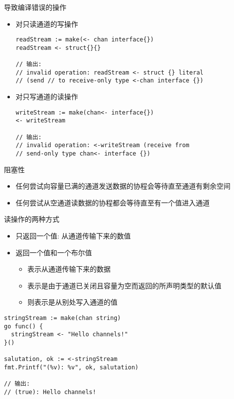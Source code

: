 \begin{frame}[fragile]{导致编译错误的操作}
\begin{itemize}
    \item 对只读通道的写操作
\begin{lstlisting}
readStream := make(<- chan interface{})
readStream <- struct{}{}

// 输出:
// invalid operation: readStream <- struct {} literal 
// (send // to receive-only type <-chan interface {})    
\end{lstlisting}
        \item 对只写通道的读操作
\begin{lstlisting}
writeStream := make(chan<- interface{})
<- writeStream

// 输出:
// invalid operation: <-writeStream (receive from 
// send-only type chan<- interface {})
\end{lstlisting}
\end{itemize}
\end{frame}

\begin{frame}{阻塞性}
    \begin{itemize}
        \item 任何尝试向容量已满的通道发送数据的协程会等待直至通道有剩余空间
        \item 任何尝试从空通道读数据的协程都会等待直至有一个值进入通道
    \end{itemize}
\end{frame}

\begin{frame}[fragile]{读操作的两种方式}
    \begin{itemize}
        \item 只返回一个值: 从通道传输下来的数值
        \item 返回一个值和一个布尔值
            \begin{itemize}
                \item {}表示从通道传输下来的数据
                \item {}表示是由于通道已关闭且容量为空而返回的所声明类型的默认值
                \item {}则表示是从别处写入通道的值
            \end{itemize}
    \end{itemize}

\begin{lstlisting}[caption={通道的两种读取操作}]
stringStream := make(chan string)
go func() {
  stringStream <- "Hello channels!"
}()

salutation, ok := <-stringStream
fmt.Printf("(%v): %v", ok, salutation)

// 输出:
// (true): Hello channels!
\end{lstlisting}
\end{frame}


